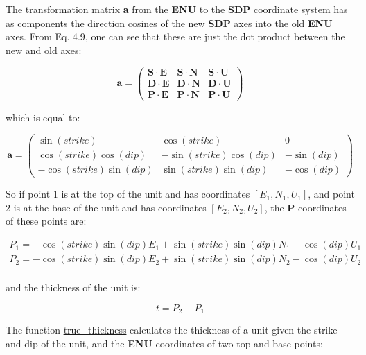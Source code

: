 \documentclass[a4paper , 12pt]{book}
\begin{document}
The transformation matrix \textbf{a} from the \textbf{ENU} to the \textbf{SDP} coordinate system has as components the direction cosines of the new \textbf{SDP} axes into the old \textbf{ENU} axes. From Eq. 4.9, one can see that these are just the dot product between the new and old axes:

\begin{equation*}
    \textbf{a}=
    \begin{pmatrix}
    \mathbf{S}\cdot\mathbf{E} & \mathbf{S}\cdot\mathbf{N} & \mathbf{S}\cdot\mathbf{U} \\
    \mathbf{D}\cdot\mathbf{E} & \mathbf{D}\cdot\mathbf{N} & \mathbf{D}\cdot\mathbf{U} \\
    \mathbf{P}\cdot\mathbf{E} & \mathbf{P}\cdot\mathbf{N} & \mathbf{P}\cdot\mathbf{U}
\end{pmatrix}
\end{equation*}

which is equal to:

\begin{equation}
    \textbf{a}=
    \begin{pmatrix}
    \sin(strike) & \cos(strike) & 0 \\
    \cos(strike)\cos(dip) & -\sin(strike)\cos(dip) & -\sin(dip) \\
    -\cos(strike)\sin(dip) & \sin(strike)\sin(dip) & -\cos(dip)
\end{pmatrix}
\end{equation}

So if point 1 is at the top of the unit and has coordinates $[E_1,N_1,U_1]$, and point 2 is at the base of the unit and has coordinates $[E_2,N_2,U_2]$, the \textbf{P} coordinates of these points are:

\begin{equation}
    \begin{gathered}
        P_1 = -\cos(strike)\sin(dip)E_1+\sin(strike)\sin(dip)N_1-\cos(dip)U_1  \\
        P_2 = -\cos(strike)\sin(dip)E_2+\sin(strike)\sin(dip)N_2-\cos(dip)U_2  \\
    \end{gathered}
\end{equation}

and the thickness of the unit is:

\begin{equation}
    t = P_2-P_1
\end{equation}{}

The function \href{https://github.com/nfcd/compGeo/blob/master/source/functions/true_thickness.py}{true\_thickness} calculates the thickness of a unit given the strike and dip of the unit, and the \textbf{ENU} coordinates of two top and base points:
\end{document}
